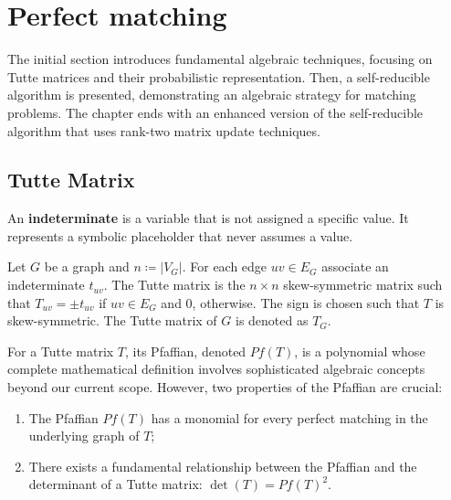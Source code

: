 \chapter{Perfect matching}
\label{chap:perfect_matching}


The initial section introduces fundamental algebraic techniques, focusing on Tutte matrices and their probabilistic representation. 
Then, a self-reducible algorithm is presented, demonstrating an algebraic strategy for matching problems. 
The chapter ends with an enhanced version of the self-reducible algorithm that uses rank-two matrix update techniques. 

\section{Tutte Matrix}

\begin{definition}[Indeterminates]
    An \textbf{indeterminate} is a variable that is not assigned a specific value. It represents a symbolic placeholder that never assumes a value.
\end{definition}

\begin{definition}
\label{def:tutte_matrix}
    Let \(G\) be a graph and \(n \coloneqq |V_G|\).
    For each edge \(uv \in E_G\) associate an indeterminate \(t_{uv}\).
    The Tutte matrix is the \(n \times n\) skew-symmetric matrix such that \(T_{uv} = \pm t_{uv}\) if \(uv \in E_G\) and \(0\), otherwise.
    The sign is chosen such that \(T\) is skew-symmetric.
    The Tutte matrix of \(G\) is denoted as \(T_G\).
\end{definition}

For a Tutte matrix \(T\), its Pfaffian, denoted \(Pf(T)\), is a polynomial whose complete mathematical definition involves sophisticated algebraic concepts beyond our current scope. 
However, two properties of the Pfaffian are crucial:
\begin{enumerate}
    \item The Pfaffian \(Pf(T)\) has a monomial for every perfect matching in the underlying graph of \(T\);
    \item There exists a fundamental relationship between the Pfaffian and the determinant of a Tutte matrix: \(\det(T) = Pf(T)^2\). 
\end{enumerate}

